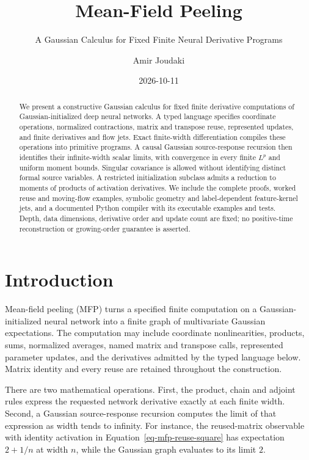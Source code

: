 \documentclass[
  11pt,
]{article}
\title{Mean-Field Peeling}
\subtitle{A Gaussian Calculus for Fixed Finite Neural Derivative
Programs}
\author{Amir Joudaki}
\date{2026-10-11}
\renewcommand*\contentsname{Table of contents}
\newcommand\contentsname{Table of contents}
\theoremstyle{definition}
\theoremstyle{plain}
\theoremstyle{plain}
\theoremstyle{plain}
\theoremstyle{remark}
\begin{document}
\maketitle
\begin{abstract}
We present a constructive Gaussian calculus for fixed finite derivative
computations of Gaussian-initialized deep neural networks. A typed
language specifies coordinate operations, normalized contractions,
matrix and transpose reuse, represented updates, and finite derivatives
and flow jets. Exact finite-width differentiation compiles these
operations into primitive programs. A causal Gaussian source-response
recursion then identifies their infinite-width scalar limits, with
convergence in every finite \(L^p\) and uniform moment bounds. Singular
covariance is allowed without identifying distinct formal source
variables. A restricted initialization subclass admits a reduction to
moments of products of activation derivatives. We include the complete
proofs, worked reuse and moving-flow examples, symbolic geometry and
label-dependent feature-kernel jets, and a documented Python compiler
with its executable examples and tests. Depth, data dimensions,
derivative order and update count are fixed; no positive-time
reconstruction or growing-order guarantee is asserted.
\end{abstract}

\clearpage
\renewcommand*\contentsname{Table of contents}
{
\setcounter{tocdepth}{2}
\tableofcontents
\clearpage
}

\section{Introduction}\label{sec-introduction}

Mean-field peeling (MFP) turns a specified finite computation on a
Gaussian-initialized neural network into a finite graph of multivariate
Gaussian expectations. The computation may include coordinate
nonlinearities, products, sums, normalized averages, named matrix and
transpose calls, represented parameter updates, and the derivatives
admitted by the typed language below. Matrix identity and every reuse
are retained throughout the construction.

There are two mathematical operations. First, the product, chain and
adjoint rules express the requested network derivative exactly at each
finite width. Second, a Gaussian source-response recursion computes the
limit of that expression as width tends to infinity. For instance, the
reused-matrix observable with identity activation in
Equation~\ref{eq-mfp-reuse-square} has expectation \(2+1/n\) at width
\(n\), while the Gaussian graph evaluates to its limit \(2\).
\end{document}
